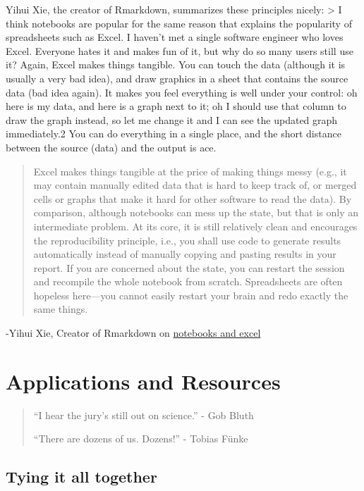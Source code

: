 \documentclass[]{book}
\begin{document}
Yihui Xie, the creator of Rmarkdown, summarizes these principles nicely:
\textgreater{} I think notebooks are popular for the same reason that explains the popularity of spreadsheets such as Excel. I haven't met a single software engineer who loves Excel. Everyone hates it and makes fun of it, but why do so many users still use it? Again, Excel makes things tangible. You can touch the data (although it is usually a very bad idea), and draw graphics in a sheet that contains the source data (bad idea again). It makes you feel everything is well under your control: oh here is my data, and here is a graph next to it; oh I should use that column to draw the graph instead, so let me change it and I can see the updated graph immediately.2 You can do everything in a single place, and the short distance between the source (data) and the output is ace.

\begin{quote}
Excel makes things tangible at the price of making things messy (e.g., it may contain manually edited data that is hard to keep track of, or merged cells or graphs that make it hard for other software to read the data). By comparison, although notebooks can mess up the state, but that is only an intermediate problem. At its core, it is still relatively clean and encourages the reproducibility principle, i.e., you shall use code to generate results automatically instead of manually copying and pasting results in your report. If you are concerned about the state, you can restart the session and recompile the whole notebook from scratch. Spreadsheets are often hopeless here---you cannot easily restart your brain and redo exactly the same things.
\end{quote}

-Yihui Xie, Creator of Rmarkdown on \href{https://yihui.org/en/2018/09/notebook-war/}{notebooks and excel}

\hypertarget{applications-and-resources}{%
\chapter{Applications and Resources}\label{applications-and-resources}}

\begin{quote}
``I hear the jury's still out on science.'' - Gob Bluth

``There are dozens of us. Dozens!'' - Tobias Fünke
\end{quote}

\hypertarget{tying-it-all-together}{%
\section{Tying it all together}\label{tying-it-all-together}}
\end{document}
